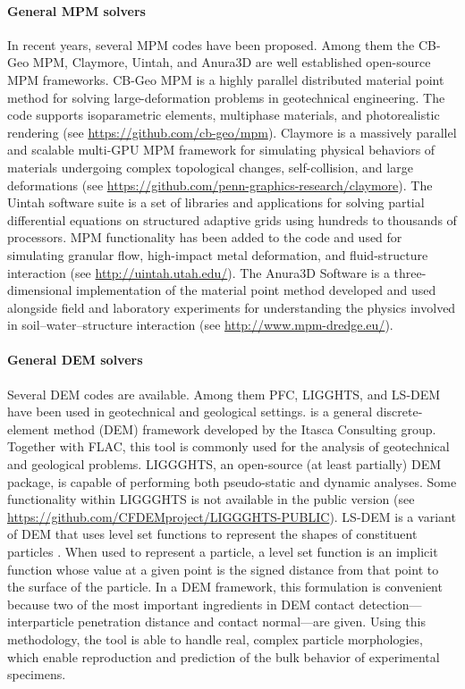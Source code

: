 \paragraph{General MPM solvers}
In recent years, several MPM codes have been proposed. Among them the CB-Geo MPM, Claymore, Uintah, and Anura3D are well established open-source MPM frameworks. CB-Geo MPM is a highly parallel distributed material point method for solving large-deformation problems in geotechnical engineering. The code supports isoparametric elements, multiphase materials, and photorealistic rendering (see 
\url{https://github.com/cb-geo/mpm}). Claymore is a massively parallel and scalable multi-GPU MPM framework for simulating physical behaviors of materials undergoing complex topological changes, self-collision, and large deformations (see \url{https://github.com/penn-graphics-research/claymore}). The Uintah software suite is a set of libraries and applications for solving partial differential equations on structured adaptive grids using hundreds to thousands of processors. MPM functionality has been added to the code and used for simulating granular flow, high-impact metal deformation, and fluid-structure interaction (see \url{http://uintah.utah.edu/}). The Anura3D Software is a three-dimensional implementation of the material point method developed and used alongside field and laboratory experiments for understanding the physics involved in soil--water--structure interaction (see \url{http://www.mpm-dredge.eu/}).

\paragraph{General DEM solvers}
Several DEM codes are available. Among them PFC, LIGGHTS, and LS-DEM have been used in geotechnical and geological settings.
 is a general discrete-element method (DEM) framework developed by the Itasca Consulting group. Together with FLAC, this tool is commonly used for the analysis of geotechnical and geological problems.
LIGGGHTS, an open-source (at least partially) DEM package, is capable of performing both pseudo-static and dynamic analyses. Some functionality within LIGGGHTS is not available in the public version (see \url{https://github.com/CFDEMproject/LIGGGHTS-PUBLIC}). LS-DEM is a variant of DEM that uses level set functions to represent the shapes of constituent particles \citep{kawamoto2018}. When used to represent a particle, a level set function is an implicit function whose value at a given point is the signed distance from that point to the surface of the particle. In a DEM framework, this formulation is convenient because two of the most important ingredients in DEM contact detection---interparticle penetration distance and contact normal---are given. Using this methodology, the tool is able to handle real, complex particle morphologies, which enable reproduction and prediction of the bulk behavior of experimental specimens.

